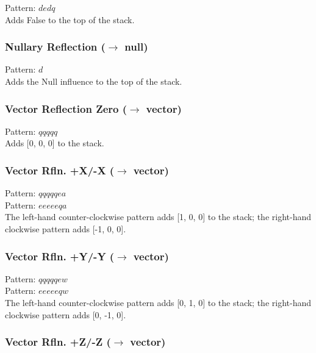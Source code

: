 \documentclass[12pt]{article}
\begin{document}
    Pattern: $dedq$\\
      Adds False to the top of the stack.\\


  \label{sec: patterns/consts@hexcasting:const/null}
\subsubsection*{Nullary Reflection ($\rightarrow$ null)}

    Pattern: $d$\\
      Adds the Null influence to the top of the stack.\\


  \label{sec: patterns/consts@hexcasting:const/vec/0}
\subsubsection*{Vector Reflection Zero ($\rightarrow$ vector)}

    Pattern: $qqqqq$\\
      Adds [0, 0, 0] to the stack.\\


  \label{sec: patterns/consts@hexcasting:const/vec/x}
\subsubsection*{Vector Rfln. +X/-X ($\rightarrow$ vector)}

    Pattern: $qqqqqea$\\
    Pattern: $eeeeeqa$\\
      The left-hand counter-clockwise pattern adds [1, 0, 0] to the stack; the right-hand clockwise pattern adds [-1, 0, 0].\\


  \label{sec: patterns/consts@hexcasting:const/vec/y}
\subsubsection*{Vector Rfln. +Y/-Y ($\rightarrow$ vector)}

    Pattern: $qqqqqew$\\
    Pattern: $eeeeeqw$\\
      The left-hand counter-clockwise pattern adds [0, 1, 0] to the stack; the right-hand clockwise pattern adds [0, -1, 0].\\


  \label{sec: patterns/consts@hexcasting:const/vec/z}
\subsubsection*{Vector Rfln. +Z/-Z ($\rightarrow$ vector)}
\end{document}
